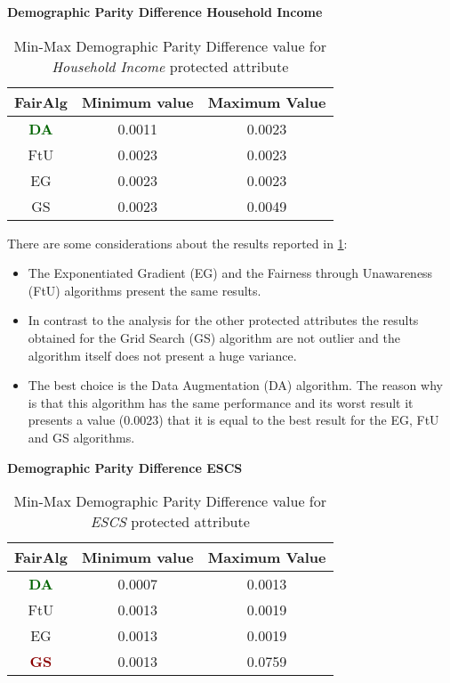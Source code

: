\textbf{Demographic Parity Difference Household Income}
\begin{table}
    \centering
    \begin{tabular}{|c|c|c|}
        \hline
        \textbf{FairAlg} & \textbf{Minimum value} & \textbf{Maximum Value} \\
        \hline
        \textcolor{darkgreen}{\textbf{DA}} & 0.0011 & 0.0023 \\
        \hline
        FtU & 0.0023 & 0.0023 \\
        \hline
        EG & 0.0023 & 0.0023 \\
        \hline
        GS & 0.0023 & 0.0049 \\
        \hline
    \end{tabular}
    \caption{Min-Max Demographic Parity Difference value for \emph{Household Income} protected attribute}
    \label{tab:h_dpd}
\end{table}

There are some considerations about the results reported in \cref{tab:h_dpd}:

\begin{itemize}
    \item The Exponentiated Gradient (EG) and the Fairness through Unawareness (FtU) algorithms present the same results.

    \item In contrast to the analysis for the other protected attributes the results obtained for the Grid Search (GS) algorithm are not outlier and the algorithm itself does not present a huge variance.

    \item The best choice is the Data Augmentation (DA) algorithm. The reason why is that this algorithm has the same performance and its worst result it presents a value (0.0023) that it is equal to the best result for the EG, FtU and GS algorithms.
\end{itemize}

\textbf{Demographic Parity Difference ESCS}
\begin{table}
    \centering
    \begin{tabular}{|c|c|c|}
        \hline
        \textbf{FairAlg} & \textbf{Minimum value} & \textbf{Maximum Value} \\
        \hline
        \textcolor{darkgreen}{\textbf{DA}} & 0.0007 & 0.0013 \\
        \hline
        FtU & 0.0013 & 0.0019 \\
        \hline
        EG & 0.0013 & 0.0019 \\
        \hline
        \textcolor{darkred}{\textbf{GS}} & 0.0013 & 0.0759 \\
        \hline
    \end{tabular}
    \caption{Min-Max Demographic Parity Difference value for \emph{ESCS} protected attribute}
    \label{tab:e_dpd}
\end{table}

